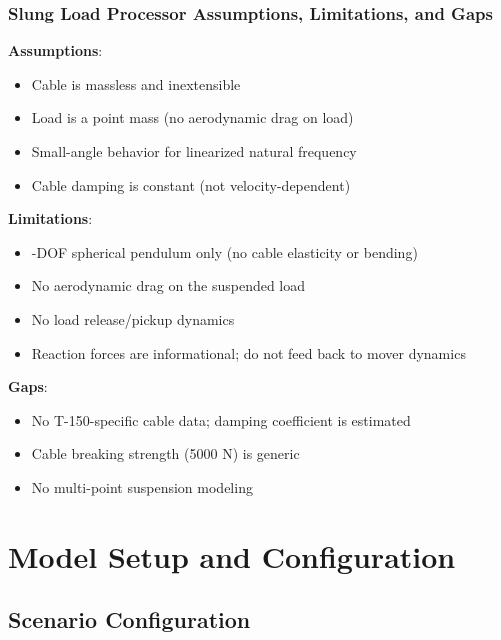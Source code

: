 \subsubsection{\unclass Slung Load Processor Assumptions, Limitations, and Gaps}\label{sec:SlungLoadALG}

\unclass \textbf{Assumptions}:
\begin{itemize}
	\item \unclass Cable is massless and inextensible
	\item \unclass Load is a point mass (no aerodynamic drag on load)
	\item \unclass Small-angle behavior for linearized natural frequency
	\item \unclass Cable damping is constant (not velocity-dependent)
\end{itemize}

\unclass \textbf{Limitations}:
\begin{itemize}
	\item {}-DOF spherical pendulum only (no cable elasticity or bending)
	\item \unclass No aerodynamic drag on the suspended load
	\item \unclass No load release/pickup dynamics
	\item \unclass Reaction forces are informational; do not feed back to mover dynamics
\end{itemize}

\unclass \textbf{Gaps}:
\begin{itemize}
	\item \unclass No T-150-specific cable data; damping coefficient is estimated
	\item \unclass Cable breaking strength (5000 N) is generic
	\item \unclass No multi-point suspension modeling
\end{itemize}

\pagebreak


\section{\unclass Model Setup and Configuration}\label{sec:ModelSetup}

\subsection{\unclass Scenario Configuration}\label{sec:ScenarioConfig}

